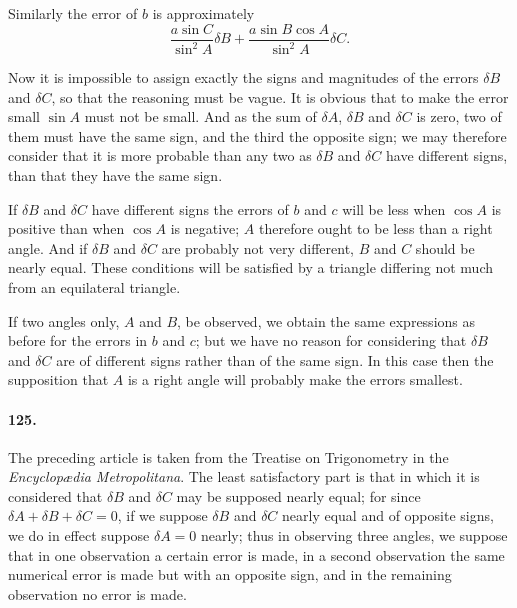 \documentclass{book}[2004/02/16]
\begin{document}
\begin{mainmatter}
\begin{spacing}{1.3}
Similarly the error of $b$ is approximately
\[
\frac{a \sin C}{\sin^2 A} \delta B + \frac{a \sin B \cos A}{\sin^2 A} \delta C.
\]

Now it is impossible to assign exactly the signs and magnitudes
of the errors $\delta B$ and $\delta C$, so that the reasoning must be vague. It
is obvious that to make the error small $\sin A$ must not be small.
And as the sum of $\delta A$, $\delta B$ and $\delta C$ is zero, two of them must have
the same sign, and the third the opposite sign; we may therefore
consider that it is more probable than any two as $\delta B$ and $\delta C$ have
different signs, than that they have the same sign.

If $\delta B$ and $\delta C$ have different signs the errors of $b$ and $c$ will
be less when $\cos A$ is positive than when $\cos A$ is negative;
$A$ therefore ought to be less than a right angle. And if $\delta B$ and
$\delta C$ are probably not very different, $B$ and $C$ should be nearly
equal. These conditions will be satisfied by a triangle differing
not much from an equilateral triangle.

If two angles only, $A$ and $B$, be observed, we obtain the same
expressions as before for the errors in $b$ and $c$; but we have
no reason for considering that $\delta B$ and $\delta C$ are of different signs
rather than of the same sign. In this case then the supposition
that $A$ is a right angle will probably make the errors smallest.

\paragraph{125.} The preceding article is taken from the Treatise on
Trigonometry in the \textit{Encyclop\ae dia Metropolitana}. The least
satisfactory part is that in which it is considered that $\delta B$ and $\delta C$
may be supposed nearly equal; for since $\delta A + \delta B + \delta C = 0$, if we
suppose $\delta B$ and $\delta C$ nearly equal and of opposite signs, we do in
effect suppose $\delta A = 0$ nearly; thus in observing three angles, we
suppose that in one observation a certain error is made, in a
second observation the same numerical error is made but with
an opposite sign, and in the remaining observation no error is
made.


\end{spacing}
\end{mainmatter}
\end{document}
